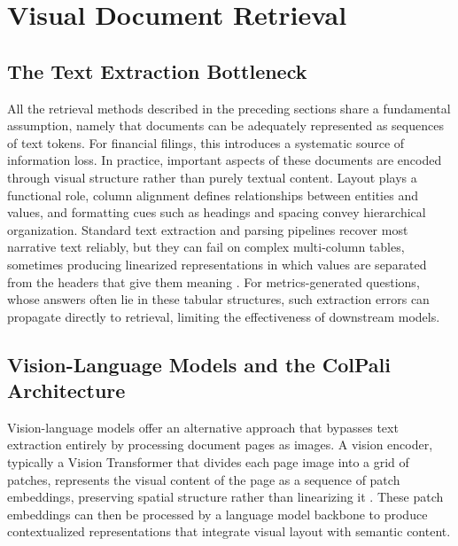 \documentclass[12pt,twoside,maitrise]{dms}
\theoremstyle{definition}
\numberwithin{equation}{section}
\numberwithin{table}{chapter}
\numberwithin{figure}{chapter}
\begin{document}
\section{Visual Document Retrieval}
\label{sec:vlm_retrieval}

\subsection{The Text Extraction Bottleneck}

All the retrieval methods described in the preceding sections share a fundamental
assumption, namely that documents can be adequately represented as sequences of
text tokens. For financial filings, this introduces a systematic source of
information loss. In practice, important aspects of these documents are encoded
through visual structure rather than purely textual content. Layout plays a
functional role, column alignment defines relationships between entities and
values, and formatting cues such as headings and spacing convey hierarchical
organization. Standard text extraction and parsing pipelines recover most narrative text
reliably, but they can fail on complex multi-column tables, sometimes producing
linearized representations in which values are separated from the headers that
give them meaning \citep{xu2020layoutlm}. For metrics-generated questions, whose answers often lie in
these tabular structures, such extraction errors can propagate directly to
retrieval, limiting the effectiveness of downstream models.

\subsection{Vision-Language Models and the ColPali Architecture}

Vision-language models offer an alternative approach that bypasses text extraction
entirely by processing document pages as images. A vision encoder, typically a Vision
Transformer that divides each page image into a grid of patches, represents the visual
content of the page as a sequence of patch embeddings, preserving spatial structure
rather than linearizing it \citep{dosovitskiy2020image}. These patch embeddings can then
be processed by a language model backbone to produce contextualized representations
that integrate visual layout with semantic content.
\end{document}
